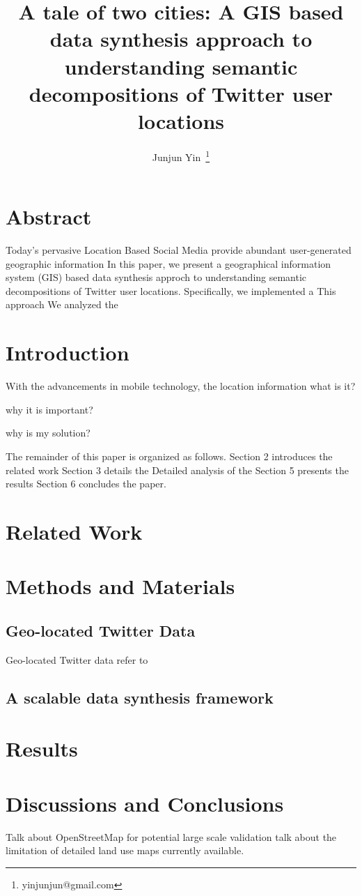 \documentclass[a4paper,11pt]{article}
\begin{document}
\title{A tale of two cities: A GIS based data synthesis approach to understanding semantic decompositions of Twitter user locations}
\author{Junjun Yin~\thanks{yinjunjun@gmail.com}}
\renewcommand\Authands{ and }
\maketitle

\section*{Abstract}
Today's pervasive Location Based Social Media provide abundant user-generated geographic information
In this paper, we present a geographical information system (GIS) based data synthesis approch to understanding semantic decompositions of Twitter user locations.
Specifically, we implemented a
This approach 
We analyzed the 

\section{Introduction}
With the advancements in mobile technology, the location information 
what is it?

why it is important?

why is my solution?

The remainder of this paper is organized as follows. Section 2 introduces the related work 
Section 3 details the 
Detailed analysis of the
Section 5 presents the results
Section 6 concludes the paper.

\section{Related Work}



\section{Methods and Materials}
\subsection{Geo-located Twitter Data}
Geo-located Twitter data refer to  


\subsection{A scalable data synthesis framework}



\section{Results}


\section{Discussions and Conclusions}
Talk about OpenStreetMap for potential large scale validation
talk about the limitation of detailed land use maps currently available.





\end{document}
